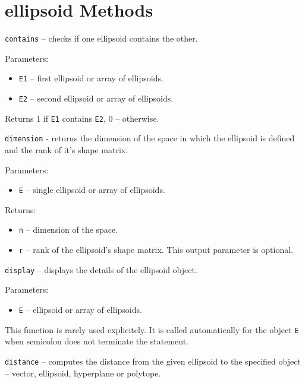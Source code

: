 \section{ellipsoid Methods}
{\Large {\tt contains}} -- checks if one ellipsoid contains the other.

Parameters:
\begin{itemize}
\item {\tt E1} -- first ellipsoid or array of ellipsoids.
\item {\tt E2} -- second ellipsoid or array of ellipsoids.
\end{itemize}

Returns $1$ if {\tt E1} contains {\tt E2}, 0 -- otherwise.
\newpage

{\Large {\tt dimension}} - returns the dimension of the space in which
the ellipsoid is defined and the rank of it's shape matrix.

Parameters:
\begin{itemize}
\item {\tt E} -- single ellipsoid or array of ellipsoids.
\end{itemize}

Returns:
\begin{itemize}
\item {\tt n} -- dimension of the space.
\item {\tt r} -- rank of the ellipsoid's shape matrix. This output parameter
is optional.
\end{itemize}



\newpage

{\Large {\tt display}} -- displays the details of the ellipsoid object.

Parameters:
\begin{itemize}
\item {\tt E} -- ellipsoid or array of ellipsoids.
\end{itemize}
This function is rarely used explicitely. It is called automatically
for the object {\tt E} when semicolon does not terminate the statement.

\newpage

{\Large {\tt distance}} -- computes the distance from the given ellipsoid
to the specified object -- vector, ellipsoid, hyperplane or polytope.

